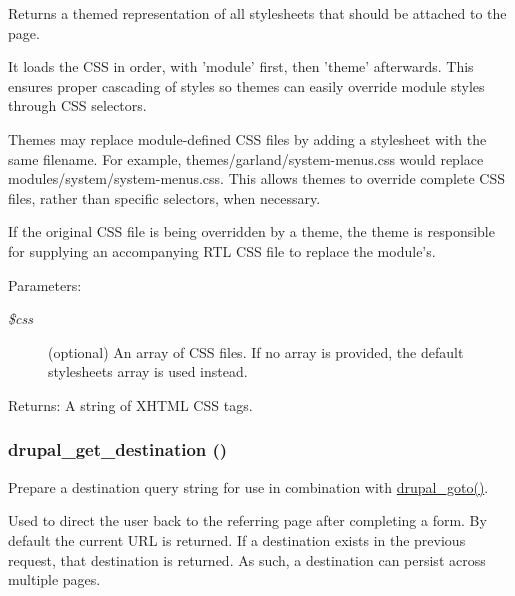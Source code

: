 Returns a themed representation of all stylesheets that should be attached to the page.

It loads the CSS in order, with 'module' first, then 'theme' afterwards. This ensures proper cascading of styles so themes can easily override module styles through CSS selectors.

Themes may replace module-defined CSS files by adding a stylesheet with the same filename. For example, themes/garland/system-menus.css would replace modules/system/system-menus.css. This allows themes to override complete CSS files, rather than specific selectors, when necessary.

If the original CSS file is being overridden by a theme, the theme is responsible for supplying an accompanying RTL CSS file to replace the module's.

\begin{Desc}
\item[Parameters:]
\begin{description}
\item[{\em \$css}](optional) An array of CSS files. If no array is provided, the default stylesheets array is used instead. \end{description}
\end{Desc}
\begin{Desc}
\item[Returns:]A string of XHTML CSS tags. \end{Desc}
\hypertarget{common_8inc_0c95c16e75ac4df882686daccc1f8ac5}{
\subsubsection[{drupal\_\-get\_\-destination}]{\setlength{\rightskip}{0pt plus 5cm}drupal\_\-get\_\-destination ()}}
\label{common_8inc_0c95c16e75ac4df882686daccc1f8ac5}


Prepare a destination query string for use in combination with \hyperlink{common_8inc_74b81f841dbbac5a119a9cc7e3ffc614}{drupal\_\-goto()}.

Used to direct the user back to the referring page after completing a form. By default the current URL is returned. If a destination exists in the previous request, that destination is returned. As such, a destination can persist across multiple pages.

